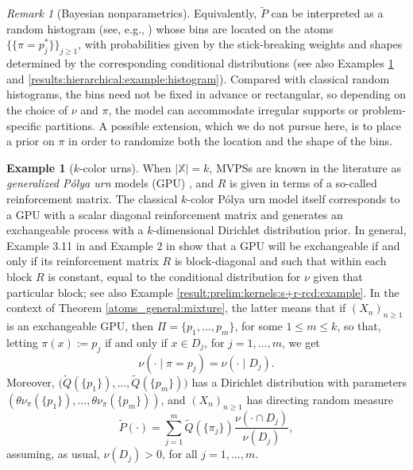 \documentclass[a4paper]{article}
\theoremstyle{plain}
\theoremstyle{remark}
\newtheorem{remark}[theorem]{Remark}
\theoremstyle{definition}
\newtheorem{example}[theorem]{Example}
\newcommand{\Polya}{P\'{o}lya }
\begin{document}
\begin{remark}[Bayesian nonparametrics]
Equivalently, $\tilde{P}$ can be interpreted as a random histogram (see, e.g., \citet[][Example 5.11]{ghosal2017}) whose bins are located on the atoms $\{\{\pi=p_j^*\}\}_{j\ge1}$, with probabilities given by the stick-breaking weights and shapes determined by the corresponding conditional distributions (see also Examples \ref{results:hierarchical:example:k-color} and \ref{results:hierarchical:example:histogram}). Compared with classical random histograms, the bins need not be fixed in advance or rectangular, so depending on the choice of $\nu$ and $\pi$, the model can accommodate irregular supports or problem-specific partitions. A possible extension, which we do not pursue here, is to place a prior on $\pi$ in order to randomize both the location and the shape of the bins.
\end{remark}

\begin{example}[$k$-color urns]\label{results:hierarchical:example:k-color}
When $|\mathbb{X}|=k$, MVPSs are known in the literature as \textit{generalized \Polya urn} models (GPU) \cite[p.\,5]{pemantle2007}, and $R$ is given in terms of a so-called reinforcement matrix. The classical $k$-color \Polya urn model itself corresponds to a GPU with a scalar diagonal reinforcement matrix and generates an exchangeable process with a $k$-dimensional Dirichlet distribution prior. In general, Example 3.11 in \cite{sariev2024} and Example 2 in \cite{sariev2023sufficientness} show that a GPU will be exchangeable if and only if its reinforcement matrix $R$ is block-diagonal and such that within each block $R$ is constant, equal to the conditional distribution for $\nu$ given that particular block; see also Example \ref{result:prelim:kernels:s+r-rcd:example}. In the context of Theorem \ref{atoms_general:mixture}, the latter means that if $(X_n)_{n\geq1}$ is an exchangeable GPU, then $\Pi=\{p_1,\ldots,p_m\}$, for some $1\leq m\leq k$, so that, letting $\pi(x):=p_j$ if and only if $x\in D_j$, for $j=1,\ldots,m$, we get
\[\nu(\cdot\mid\pi=p_j)=\nu(\cdot\mid D_j).\]
Moreover, $\bigl(\tilde{Q}(\{p_1\}),\ldots,\tilde{Q}(\{p_m\})\bigr)$ has a Dirichlet distribution with parameters $(\theta\nu_\pi(\{p_1\}),\ldots,\theta\nu_\pi(\{p_m\}))$, and $(X_n)_{n\geq1}$ has directing random measure
\[\tilde{P}(\cdot)=\sum_{j=1}^m\tilde{Q}(\{\pi_j\})\frac{\nu(\cdot\cap D_j)}{\nu(D_j)},\]
assuming, as usual, $\nu(D_j)>0$, for all $j=1,\ldots,m$.
\end{example}
\end{document}
